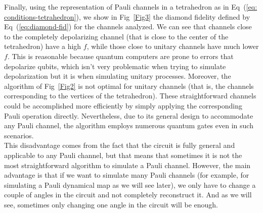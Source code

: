 \documentclass[10pt,letterpaper]{article} %
\newcommand{\fref}[1]{Fig~\ref{#1}}
\newcommand{\eref}[1]{Eq~(\ref{#1})}
\begin{document}
Finally, using the representation of Pauli channels in a tetrahedron as in
\eref{eq: conditions-tetrahedron}, we show in \fref{Fig3} the diamond
fidelity defined by \eref{eq:diamond-fid} for the channels analyzed.  We can
see that channels close to the completely depolarizing channel (that is close
to the center of the tetrahedron) have a high $f$, while those close to unitary
channels have much lower $f$.  
 This is reasonable because quantum computers are
prone to errors that depolarize qubits, which isn't very problematic when
trying to simulate depolarization but it is when simulating unitary processes.
Moreover, the algorithm of \fref{Fig2} is not optimal for
unitary channels  (that is, the channels corresponding to the vertices of the
tetrahedron).  These straightforward channels could be accomplished more
efficiently by simply applying the corresponding Pauli operation directly. 
Nevertheless, due to its general design to accommodate any Pauli channel, the
algorithm employs numerous quantum gates even in such scenarios. 
\\
{\color{green} This disadvantage comes from the fact
that the circuit is  fully general and applicable to any Pauli channel, but that means that sometimes
it is not the most straightforward algorithm to simulate a Pauli channel.
However, the main advantage is that if we want 
to simulate many Pauli channels (for example,
for simulating a Pauli dynamical map as we will see later),
we only have to change a couple of angles in the circuit and
not completely reconstruct it. 
And as we will see, sometimes only changing
one angle in the circuit will be enough.}\\
$\;$\\
\end{document}

